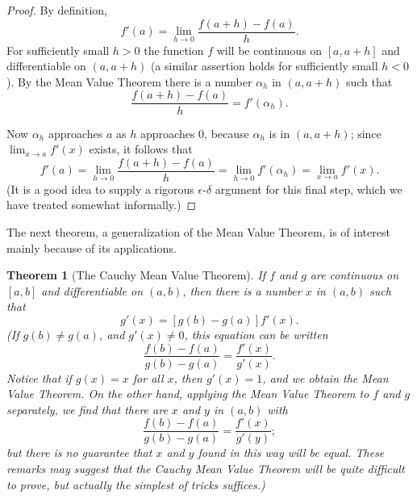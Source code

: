 \documentclass{article}
\newtheorem{theorem}{Theorem}
\begin{document}
\begin{proof}
  By definition, \begin{equation*}
    f'(a) = \lim_{h \rightarrow 0} \frac{f(a + h) - f(a)}{h}.
  \end{equation*} For sufficiently small $h > 0$ the function $f$ will be
  continuous on $[a, a + h]$ and differentiable on $(a, a + h)$ (a similar
  assertion holds for sufficiently small $h < 0$). By the Mean Value Theorem
  there is a number $\alpha_h$ in $(a, a + h)$ such that \begin{equation*}
    \frac{f(a + h) - f(a)}{h} = f'(\alpha_h).
  \end{equation*}

  Now $\alpha_h$ approaches $a$ as $h$ approaches 0, because $\alpha_h$ is in
  $(a, a + h)$; since $\lim_{x \rightarrow a} f'(x)$ exists, it follows that
  \begin{equation*}
    f'(a) = \lim_{h \rightarrow 0} \frac{f(a + h) - f(a)}{h} = \lim_{h
      \rightarrow 0} f'(\alpha_h) = \lim_{x \rightarrow a} f'(x).
  \end{equation*} (It is a good idea to supply a rigorous $\epsilon$-$\delta$
  argument for this final step, which we have treated somewhat informally.)
\end{proof}

The next theorem, a generalization of the Mean Value Theorem, is of interest
mainly because of its applications.

\begin{theorem}[The Cauchy Mean Value Theorem]
  If $f$ and $g$ are continuous on $[a, b]$ and differentiable on $(a, b)$,
  then there is a number $x$ in $(a, b)$ such that \begin{equation*}
    [f(b) - f(a)]g'(x) = [g(b) - g(a)]f'(x).
  \end{equation*} (If $g(b) \neq g(a)$, and $g'(x) \neq 0$, this equation can
  be written \begin{equation*}
    \frac{f(b) - f(a)}{g(b) - g(a)} = \frac{f'(x)}{g'(x)}.
  \end{equation*} Notice that if $g(x) = x$ for all $x$, then $g'(x) = 1$, and
  we obtain the Mean Value Theorem. On the other hand, applying the Mean Value
  Theorem to $f$ and $g$ separately, we find that there are $x$ and $y$ in $(a,
  b)$ with \begin{equation*}
    \frac{f(b) - f(a)}{g(b) - g(a)} = \frac{f'(x)}{g'(y)};
  \end{equation*} but there is no guarantee that $x$ and $y$ found in this way
  will be equal. These remarks may suggest that the Cauchy Mean Value Theorem
  will be quite difficult to prove, but actually the simplest of tricks
  suffices.)
\end{theorem}
\end{document}
